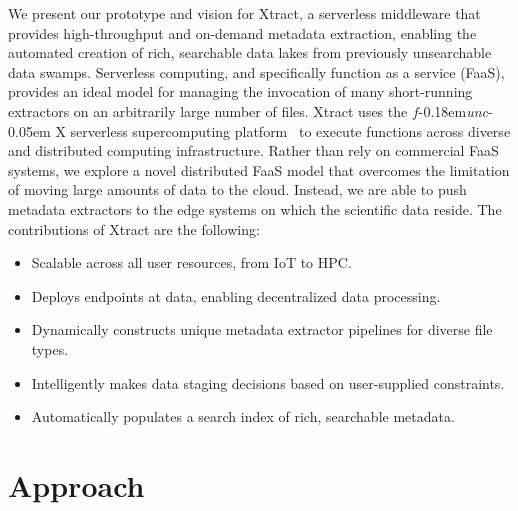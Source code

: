 \documentclass[sigconf, 9pt]{acmart}
\newcommand{\kyle}[1]{}
\newcommand{\kyle}[1]{{\textcolor{purple}{ Kyle: #1 }}}
\newcommand{\name}{Xtract}
\newcommand{\funcx}{$f$\kern-0.18em\emph{unc}\kern-0.05em X}
\begin{document}
We present our prototype and vision for \name{},
a serverless middleware that provides high-throughput and on-demand metadata 
extraction, enabling the automated creation of rich, searchable data lakes from previously unsearchable data swamps. 
Serverless computing, and specifically function as a service (FaaS),
provides an ideal model for managing the invocation of
many short-running extractors on an arbitrarily large number of files. 
\name{} uses the \funcx{} serverless supercomputing platform~\cite{chard2019serverless}
to execute functions across diverse and distributed computing infrastructure.
Rather than rely on commercial FaaS systems, we explore a novel distributed FaaS model 
that overcomes the limitation of moving large amounts of data to the cloud. 
Instead, we are able to push
metadata extractors to the edge systems on which the scientific data reside. 
The contributions of \name{} are the following: 
\begin{itemize}
\item Scalable across all user resources, from IoT to HPC. 
\item Deploys endpoints at data, enabling decentralized data processing. 
\item Dynamically constructs unique metadata extractor pipelines for diverse file types. 
\item Intelligently makes data staging decisions based on user-supplied constraints. 
\item Automatically populates a search index of rich, searchable metadata. 
\end{itemize}





\section{Approach}
\label{sec:approach}
\end{document}
